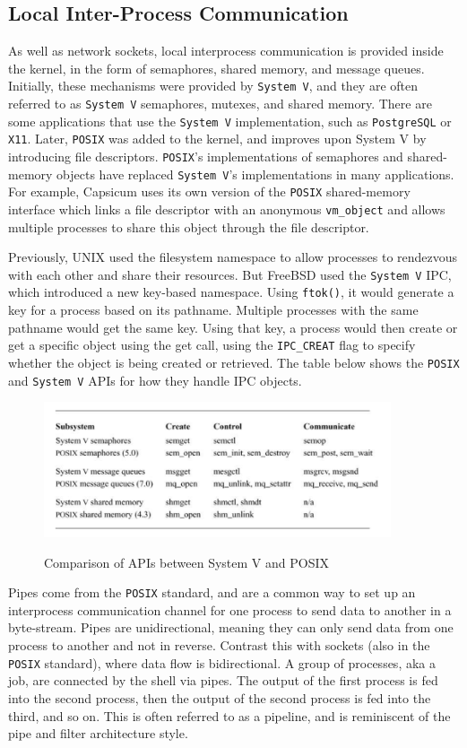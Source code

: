 \documentclass[12pt, dvipsnames, a4paper]{article}
\newcommand{\code}[1]{\texttt{#1}}
\begin{document}
\subsection{Local Inter-Process Communication}
As well as network sockets, local interprocess communication is provided inside the kernel, in the form of semaphores, shared memory, and message queues. Initially, these mechanisms were provided by \code{System V}, and they are often referred to as \code{System V} semaphores, mutexes, and shared memory. There are some applications that use the \code{System V} implementation, such as \code{PostgreSQL} or \code{X11}. Later, \code{POSIX} was added to the kernel, and improves upon System V by introducing file descriptors. \code{POSIX}’s implementations of semaphores and shared-memory objects have replaced \code{System V}’s implementations in many applications. For example, Capsicum uses its own version of the \code{POSIX} shared-memory interface which links a file descriptor with an anonymous \code{vm\_object} and allows multiple processes to share this object through the file descriptor.

Previously, UNIX used the filesystem namespace to allow processes to rendezvous with each other and share their resources. But FreeBSD used the \code{System V} IPC, which introduced a new key-based namespace. Using \code{ftok()}, it would generate a key for a process based on its pathname. Multiple processes with the same pathname would get the same key. Using that key, a process would then create or get a specific object using the get call, using the \code{IPC\_CREAT} flag to specify whether the object is being created or retrieved. The table below shows the \code{POSIX} and \code{System V} APIs for how they handle IPC objects.

\newpage
\begin{figure}[hbt!]
	\centering
	\includegraphics[width=290pt]{assets/localipc1.png}
	\caption{Comparison of APIs between System V and POSIX} \cite{mckusick}
\end{figure}

Pipes come from the \code{POSIX} standard, and are a common way to set up an interprocess communication channel for one process to send data to another in a byte-stream. Pipes are unidirectional, meaning they can only send data from one process to another and not in reverse. Contrast this with sockets (also in the \code{POSIX} standard), where data flow is bidirectional. A group of processes, aka a job, are connected by the shell via pipes. The output of the first process is fed into the second process, then the output of the second process is fed into the third, and so on. This is often referred to as a pipeline, and is reminiscent of the pipe and filter architecture style.
\end{document}
